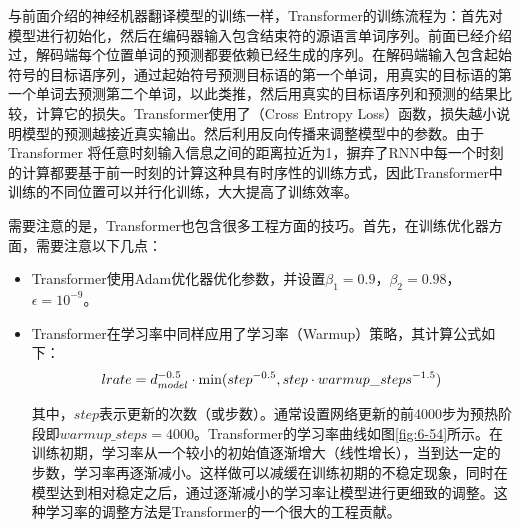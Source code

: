 \parinterval 与前面介绍的神经机器翻译模型的训练一样，Transformer的训练流程为：首先对模型进行初始化，然后在编码器输入包含结束符的源语言单词序列。前面已经介绍过，解码端每个位置单词的预测都要依赖已经生成的序列。在解码端输入包含起始符号的目标语序列，通过起始符号预测目标语的第一个单词，用真实的目标语的第一个单词去预测第二个单词，以此类推，然后用真实的目标语序列和预测的结果比较，计算它的损失。Transformer使用了{\small{}}（Cross Entropy Loss）函数，损失越小说明模型的预测越接近真实输出。然后利用反向传播来调整模型中的参数。由于Transformer 将任意时刻输入信息之间的距离拉近为1，摒弃了RNN中每一个时刻的计算都要基于前一时刻的计算这种具有时序性的训练方式，因此Transformer中训练的不同位置可以并行化训练，大大提高了训练效率。

%

\parinterval 需要注意的是，Transformer也包含很多工程方面的技巧。首先，在训练优化器方面，需要注意以下几点：

\begin{itemize}
\vspace{0.5em}
\item	Transformer使用Adam优化器优化参数，并设置$\beta_1=0.9$，$\beta_2=0.98$，$\epsilon=10^{-9}$。
\vspace{0.5em}
\item Transformer在学习率中同样应用了学习率{\small{}}（Warmup）策略，其计算公式如下：
\begin{eqnarray}
lrate = d_{model}^{-0.5} \cdot \textrm{min} (step^{-0.5} , step \cdot warmup\_steps^{-1.5})
\label{eq:6-53}
\vspace{0.5em}
\end{eqnarray}

其中，$step$表示更新的次数（或步数）。通常设置网络更新的前4000步为预热阶段即$warmup\_steps=4000$。Transformer的学习率曲线如图\ref{fig:6-54}所示。在训练初期，学习率从一个较小的初始值逐渐增大（线性增长），当到达一定的步数，学习率再逐渐减小。这样做可以减缓在训练初期的不稳定现象，同时在模型达到相对稳定之后，通过逐渐减小的学习率让模型进行更细致的调整。这种学习率的调整方法是Transformer的一个很大的工程贡献。
\vspace{0.5em}
\end{itemize}

